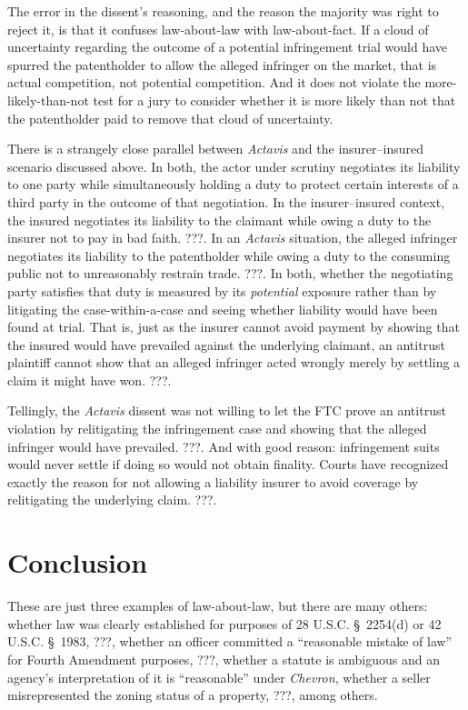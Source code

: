 \documentclass[
  12pt,
  letterpaper,
]{scrartcl}
\begin{document}
The error in the dissent's reasoning, and the reason the majority was right to
reject it, is that it confuses law-about-law with law-about-fact. If a cloud of
uncertainty regarding the outcome of a potential infringement trial would have
spurred the patentholder to allow the alleged infringer on the market, that is
actual competition, not potential competition. And it does not violate the
more-likely-than-not test for a jury to consider whether it is more likely than
not that the patentholder paid to remove that cloud of uncertainty.

There is a strangely close parallel between \textit{Actavis} and the
insurer--insured scenario discussed above. In both, the actor under scrutiny
negotiates its liability to one party while simultaneously holding a duty to
protect certain interests of a third party in the outcome of that negotiation.
In the insurer--insured context, the insured negotiates its liability to the
claimant while owing a duty to the insurer not to pay in bad faith. ???. In an
\emph{Actavis} situation, the alleged infringer negotiates its liability to the
patentholder while owing a duty to the consuming public not to unreasonably
restrain trade. ???. In both, whether the negotiating party satisfies that duty
is measured by its \emph{potential} exposure rather than by litigating the
case-within-a-case and seeing whether liability would have been found at trial.
That is, just as the insurer cannot avoid payment by showing that the insured
would have prevailed against the underlying claimant, an antitrust plaintiff
cannot show that an alleged infringer acted wrongly merely by settling a claim
it might have won. ???.

Tellingly, the \textit{Actavis} dissent was not willing to let the FTC prove an
antitrust violation by relitigating the infringement case and showing that the
alleged infringer would have prevailed. ???. And with good reason: infringement
suits would never settle if doing so would not obtain finality. Courts have
recognized exactly the reason for not allowing a liability insurer to avoid
coverage by relitigating the underlying claim. ???.


\section{Conclusion}

These are just three examples of law-about-law, but there are many others:
whether law was clearly established for purposes of 28 U.S.C. § 2254(d) or 42
U.S.C. § 1983, ???, whether an officer committed a ``reasonable mistake of
law'' for Fourth Amendment purposes, ???, whether a statute is ambiguous and an
agency's interpretation of it is ``reasonable'' under \textit{Chevron}, whether
a seller misrepresented the zoning status of a property, ???, among others.
\end{document}
